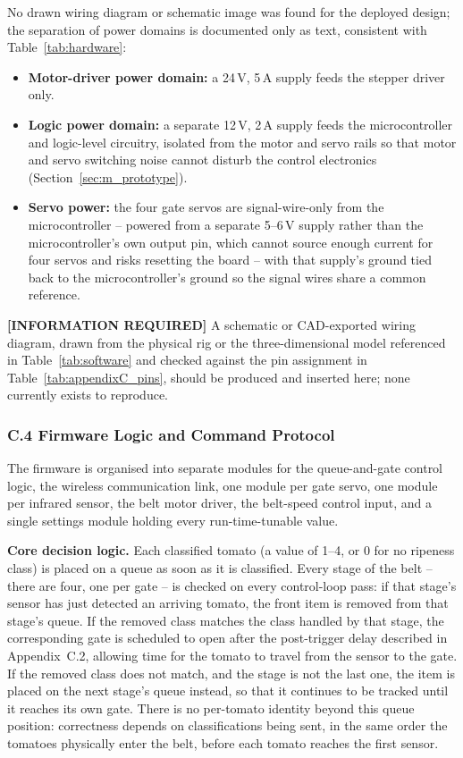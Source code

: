 No drawn wiring diagram or schematic image was found for the deployed design; the separation of power domains is documented only as text, consistent with Table~\ref{tab:hardware}:

\begin{itemize}
    \item \textbf{Motor-driver power domain:} a 24\,V, 5\,A supply feeds the stepper driver only.
    \item \textbf{Logic power domain:} a separate 12\,V, 2\,A supply feeds the microcontroller and logic-level circuitry, isolated from the motor and servo rails so that motor and servo switching noise cannot disturb the control electronics (Section~\ref{sec:m_prototype}).
    \item \textbf{Servo power:} the four gate servos are signal-wire-only from the microcontroller -- powered from a separate 5--6\,V supply rather than the microcontroller's own output pin, which cannot source enough current for four servos and risks resetting the board -- with that supply's ground tied back to the microcontroller's ground so the signal wires share a common reference.
\end{itemize}

\textbf{[INFORMATION REQUIRED]} A schematic or CAD-exported wiring diagram, drawn from the physical rig or the three-dimensional model referenced in Table~\ref{tab:software} and checked against the pin assignment in Table~\ref{tab:appendixC_pins}, should be produced and inserted here; none currently exists to reproduce.

\subsubsection*{C.4 Firmware Logic and Command Protocol}

The firmware is organised into separate modules for the queue-and-gate control logic, the wireless communication link, one module per gate servo, one module per infrared sensor, the belt motor driver, the belt-speed control input, and a single settings module holding every run-time-tunable value.

\textbf{Core decision logic.} Each classified tomato (a value of 1--4, or 0 for no ripeness class) is placed on a queue as soon as it is classified. Every stage of the belt -- there are four, one per gate -- is checked on every control-loop pass: if that stage's sensor has just detected an arriving tomato, the front item is removed from that stage's queue. If the removed class matches the class handled by that stage, the corresponding gate is scheduled to open after the post-trigger delay described in Appendix~C.2, allowing time for the tomato to travel from the sensor to the gate. If the removed class does not match, and the stage is not the last one, the item is placed on the next stage's queue instead, so that it continues to be tracked until it reaches its own gate. There is no per-tomato identity beyond this queue position: correctness depends on classifications being sent, in the same order the tomatoes physically enter the belt, before each tomato reaches the first sensor.

